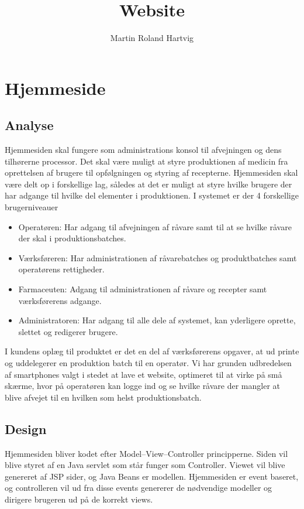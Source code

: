 \documentclass[a4paper]{article}
\title{Website}
\author{
  Martin Roland Hartvig
}
\begin{document}

\section{Hjemmeside} %

\subsection{Analyse} %

Hjemmesiden skal fungere som administrations konsol til afvejningen og dens tilhørerne processor.  Det skal være muligt at styre produktionen af medicin fra oprettelsen af brugere til opfølgningen og styring af recepterne.  Hjemmesiden skal være delt op i forskellige lag, således at det er muligt at styre hvilke brugere der har adgange til hvilke del elementer i produktionen. I systemet er der 4 forskellige brugerniveauer
\begin{itemize}
  \item Operatøren: Har adgang til afvejningen af råvare samt til at se hvilke råvare der skal i produktionsbatches.
  \item Værksføreren: Har administrationen af råvarebatches og produktbatches samt operatørens rettigheder.
  \item Farmaceuten: Adgang til administrationen af råvare og recepter samt værksførerens adgange. 
  \item Administratoren: Har adgang til alle dele af systemet, kan yderligere oprette, slettet og redigerer brugere.
\end{itemize}
I kundens oplæg til produktet er det en del af værksførerens opgaver, at ud printe og uddelegerer en produktion batch til en operatør. Vi har grunden udbredelsen af smartphones valgt i stedet at lave et website, optimeret til at virke på små skærme, hvor på operatøren kan logge ind og se hvilke råvare der mangler at blive afvejet til en hvilken som helst produktionsbatch. 


\subsection{Design} %

Hjemmesiden bliver kodet efter Model–View–Controller principperne. Siden vil blive styret af en Java servlet som står funger som Controller. Viewet vil blive genereret af JSP sider, og Java Beans er modellen.  Hjemmesiden er event baseret, og controlleren vil ud fra disse events genererer de nødvendige modeller og dirigere brugeren ud på de korrekt views.
\end{document}
